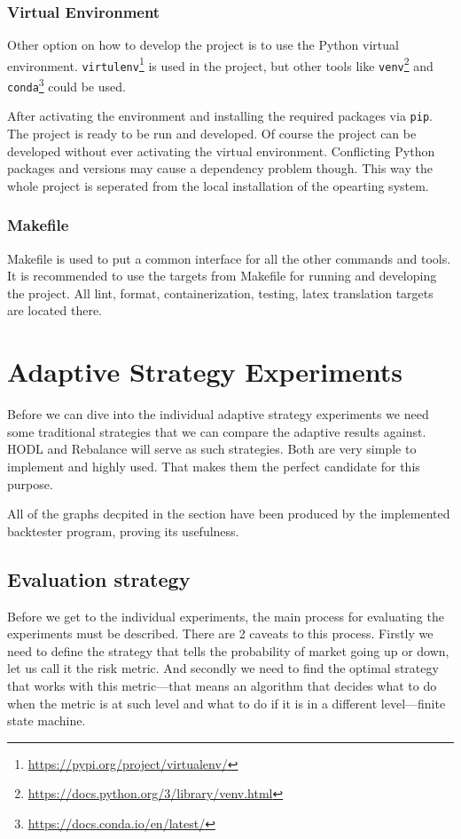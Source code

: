\subsection*{Virtual Environment}
Other option on how to develop the project is to use the Python virtual environment. \texttt{virtulenv}\footnote{\url{https://pypi.org/project/virtualenv/}} is used in the project, but other tools like \texttt{venv}\footnote{\url{https://docs.python.org/3/library/venv.html}} and \texttt{conda}\footnote{\url{https://docs.conda.io/en/latest/}} could be used.

After activating the environment and installing the required packages via \texttt{pip}. The project is ready to be run and developed. Of course the project can be developed without ever activating the virtual environment. Conflicting Python packages and versions may cause a dependency problem though. This way the whole project is seperated from the local installation of the opearting system.

\subsection*{Makefile}
Makefile is used to put a common interface for all the other commands and tools. It is recommended to use the targets from Makefile for running and developing the project. All lint, format, containerization, testing, latex translation targets are located there.

\chapter{Adaptive Strategy Experiments}
\label{chapter-experiments}

Before we can dive into the individual adaptive strategy experiments we need some traditional strategies that we can compare the adaptive results against. HODL and Rebalance will serve as such strategies. Both are very simple to implement and highly used. That makes them the perfect candidate for this purpose.

All of the graphs decpited in the section have been produced by the implemented backtester program, proving its usefulness.

\section{Evaluation strategy}
Before we get to the individual experiments, the main process for evaluating the experiments must be described. There are 2 caveats to this process. Firstly we need to define the strategy that tells the probability of market going up or down, let us call it the risk metric. And secondly we need to find the optimal strategy that works with this metric---that means an algorithm that decides what to do when the metric is at such level and what to do if it is in a different level---finite state machine.

